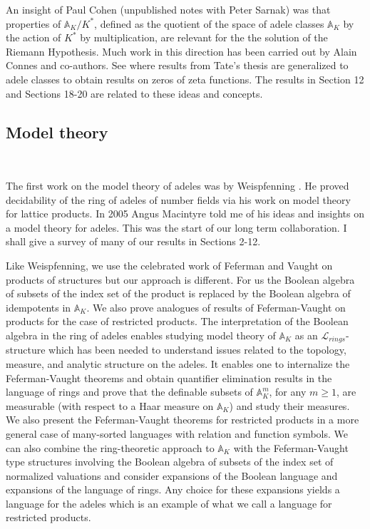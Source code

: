 \documentclass[12pt]{amsart}
\def\A{\mathbb{A}}
\def\cL{\mathcal{L}}
\def\cL{\mathcal{L}}
\numberwithin{equation}{section}
\begin{document}
An insight of Paul Cohen (unpublished notes with Peter Sarnak) was that properties of $\A_K/K^*$, defined as the quotient of the space of adele classes $\A_K$ by the action of 
$K^*$ by multiplication, are relevant for the the solution of the Riemann Hypothesis. Much work in this direction has been carried out by Alain Connes and co-authors. See \cite{connes-selecta} where results from Tate's thesis are generalized to adele classes to obtain results on zeros of zeta functions. The results in Section 12 and Sections 18-20 are related to these ideas and concepts.

\medskip

\subsection{\bf Model theory} 

\

\medskip

The first work on the model theory of adeles was by Weispfenning \cite{weisp-hab}. He proved decidability of the ring of adeles of number fields via his work on model theory for lattice products. In 2005 Angus Macintyre told me of his ideas and insights on a model theory for adeles. This was the start of our long term collaboration. I shall give a survey of many of our results in Sections 2-12. 

Like Weispfenning, we use the celebrated work of Feferman and Vaught \cite{FV} on products of structures but our approach is  different. For us the Boolean algebra of subsets of the index set of the product is replaced by the Boolean algebra of idempotents in $\A_K$. We also prove analogues of results of Feferman-Vaught on products for the case of restricted products. The interpretation of the Boolean algebra in the ring of adeles enables studying model theory of $\A_K$ as an $\cL_{rings}$-structure which has been needed to understand issues related to the topology, measure, and analytic structure on the adeles. It enables one to internalize the Feferman-Vaught theorems and obtain quantifier elimination results in the language of rings and prove that the definable subsets of $\A_K^m$, for any $m\geq 1$, are measurable (with respect to a Haar measure on $\A_K$) and study their measures. We also present the Feferman-Vaught theorems for restricted products in a more general case of many-sorted languages with relation and function symbols. We can also combine the ring-theoretic approach to $\A_K$ with the Feferman-Vaught type structures involving the Boolean algebra of subsets of the index set of normalized valuations 
and consider expansions of the Boolean language and expansions of the language of rings. Any choice for these expansions yields a language for the adeles which is an example of what we call a language for restricted products.
\end{document}
